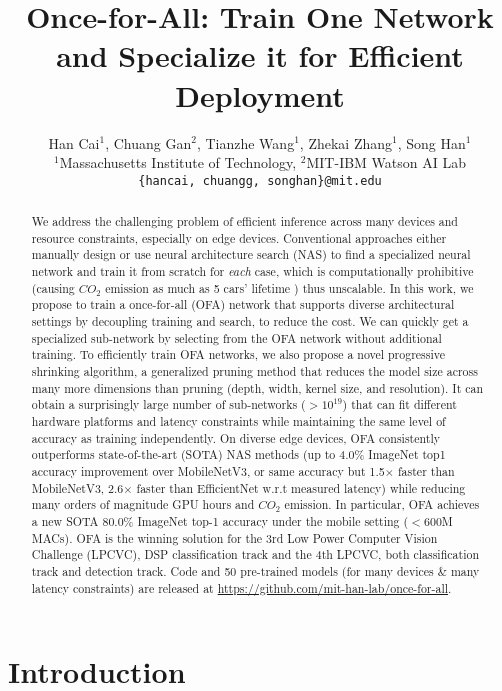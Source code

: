 \documentclass{article} \usepackage{iclr2020_conference,times}
\title{Once-for-All: Train One Network and Specialize it for Efficient Deployment}
\author{
    Han Cai$^1$, Chuang Gan$^2$, Tianzhe Wang$^1$, Zhekai Zhang$^1$, Song Han$^1$\\
    $^1$Massachusetts Institute of Technology, \quad $^2$MIT-IBM Watson AI Lab\\
    {\small\texttt{\{hancai, chuangg, songhan\}@mit.edu}}
}
\begin{document}
\maketitle
\begin{abstract}
We address the challenging problem of efficient inference across many devices and resource constraints, especially on edge devices.  Conventional approaches either manually design or use neural architecture search (NAS) to find a specialized neural network and train it from scratch for \textit{each} case, which is computationally prohibitive (causing $CO_2$ emission as much as 5 cars' lifetime \cite{strubell2019energy}) thus unscalable. 
In this work, we propose to train a once-for-all (OFA) network that supports diverse architectural settings by decoupling training and search, to reduce the cost. 
We can quickly get a specialized sub-network by selecting from the OFA network without additional training. To efficiently train OFA networks, we also propose a novel progressive shrinking algorithm, a generalized pruning method that reduces the model size across many more dimensions than pruning (depth, width, kernel size, and resolution). It can obtain a surprisingly large number of sub-networks ($> 10^{19}$) that can fit different hardware platforms and latency constraints while maintaining the same level of accuracy as training independently. 
On diverse edge devices, OFA consistently outperforms state-of-the-art (SOTA) NAS methods (up to 4.0\% ImageNet top1 accuracy improvement over MobileNetV3, or same accuracy but 1.5$\times$ faster than MobileNetV3, 2.6$\times$ faster than EfficientNet w.r.t measured latency) while reducing many orders of magnitude GPU hours and $CO_2$ emission. In particular, OFA achieves a new SOTA 80.0\% ImageNet top-1 accuracy under the mobile setting ($<$600M MACs). OFA is the winning solution for the 3rd Low Power Computer Vision Challenge (LPCVC), DSP classification track and the 4th LPCVC, both classification track and detection track. Code and  50 pre-trained models (for many devices \& many latency constraints) are released at \url{https://github.com/mit-han-lab/once-for-all}. 
\end{abstract}

\section{Introduction}
\end{document}
